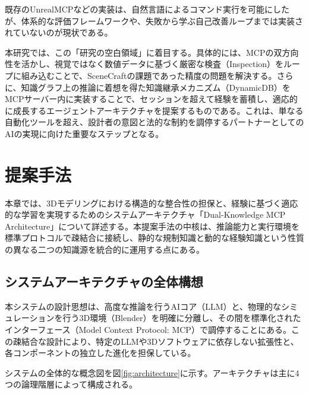 \documentclass[dvipdfmx, a4paper, 9pt]{deimj}
\begin{document}
既存のUnrealMCP\cite{unrealmcp2024}などの実装は、自然言語によるコマンド実行を可能にしたが、体系的な評価フレームワークや、失敗から学ぶ自己改善ループまでは実装されていないのが現状である。

本研究では、この「研究の空白領域」に着目する。具体的には、MCPの双方向性を活かし、視覚ではなく数値データに基づく厳密な検査（Inspection）をループに組み込むことで、SceneCraftの課題であった精度の問題を解決する。さらに、知識グラフ上の推論に着想を得た知識継承メカニズム（DynamicDB）をMCPサーバー内に実装することで、セッションを超えて経験を蓄積し、適応的に成長するエージェントアーキテクチャを提案するものである。これは、単なる自動化ツールを超え、設計者の意図と法的な制約を調停するパートナーとしてのAIの実現に向けた重要なステップとなる。

\section{提案手法}

本章では、3Dモデリングにおける構造的な整合性の担保と、経験に基づく適応的な学習を実現するためのシステムアーキテクチャ「Dual-Knowledge MCP Architecture」について詳述する。本提案手法の中核は、推論能力と実行環境を標準プロトコルで疎結合に接続し、静的な規制知識と動的な経験知識という性質の異なる二つの知識源を統合的に運用する点にある。

\subsection{システムアーキテクチャの全体構想}

本システムの設計思想は、高度な推論を行うAIコア（LLM）と、物理的なシミュレーションを行う3D環境（Blender\cite{community2018blender}）を明確に分離し、その間を標準化されたインターフェース（Model Context Protocol: MCP）で調停することにある。この疎結合な設計により、特定のLLMや3Dソフトウェアに依存しない拡張性と、各コンポーネントの独立した進化を担保している。

システムの全体的な概念図を図\ref{fig:architecture}に示す。アーキテクチャは主に4つの論理階層によって構成される。
\end{document}
